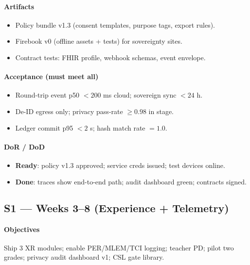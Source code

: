 \documentclass[11pt]{article}
\theoremstyle{plain}
\begin{document}
\paragraph{Artifacts}
\begin{itemize}
  \item Policy bundle v1.3 (consent templates, purpose tags, export rules).
  \item Firebook v0 (offline assets + tests) for sovereignty sites.
  \item Contract tests: FHIR profile, webhook schemas, event envelope.
\end{itemize}

\paragraph{Acceptance (must meet all)}
\begin{itemize}
  \item Round-trip event p50 $<200$ ms cloud; sovereign sync $<24$ h.
  \item De-ID egress only; privacy pass-rate $\ge 0.98$ in stage.
  \item Ledger commit p95 $<2$ s; hash match rate $=1.0$.
\end{itemize}

\paragraph{DoR / DoD}
\begin{itemize}
  \item \textbf{Ready}: policy v1.3 approved; service creds issued; test devices online.
  \item \textbf{Done}: traces show end-to-end path; audit dashboard green; contracts signed.
\end{itemize}

\subsection{S1 — Weeks 3–8 (Experience + Telemetry)}
\paragraph{Objectives}
Ship 3 XR modules; enable PER/MLEM/TCI logging; teacher PD; pilot two grades; privacy audit dashboard v1; CSL gate library.
\end{document}

